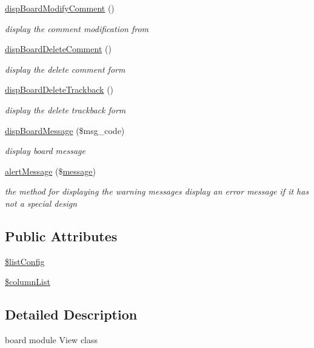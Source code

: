 \begin{DoxyCompactItemize}
\hyperlink{classboardView_a2c26d7a7ea01ac2f6dfd1dbe9c5effce}{disp\-Board\-Modify\-Comment} ()
\begin{DoxyCompactList}\small\item\em display the comment modification from \end{DoxyCompactList}\item 
\hyperlink{classboardView_abb9180578737e27fe2bd16485ccf2df0}{disp\-Board\-Delete\-Comment} ()
\begin{DoxyCompactList}\small\item\em display the delete comment form \end{DoxyCompactList}\item 
\hyperlink{classboardView_aefd0c292301210361b441d848a42a7eb}{disp\-Board\-Delete\-Trackback} ()
\begin{DoxyCompactList}\small\item\em display the delete trackback form \end{DoxyCompactList}\item 
\hyperlink{classboardView_ae42a2efcaf9e04de795a8a895a68fad4}{disp\-Board\-Message} (\$msg\-\_\-code)
\begin{DoxyCompactList}\small\item\em display board message \end{DoxyCompactList}\item 
\hyperlink{classboardView_a421e95c8dd73767264da56ca4d1e360d}{alert\-Message} (\$\hyperlink{classmessage}{message})
\begin{DoxyCompactList}\small\item\em the method for displaying the warning messages display an error message if it has not a special design \end{DoxyCompactList}\end{DoxyCompactItemize}
\subsection*{Public Attributes}
\begin{DoxyCompactItemize}
\item 
\hyperlink{classboardView_a8d64b7032d159a960972ae38f76897f8}{\$list\-Config}
\item 
\hyperlink{classboardView_a44f0d3c92b73c34329708f5fe44652cc}{\$column\-List}
\end{DoxyCompactItemize}


\subsection{Detailed Description}
board module View class 

